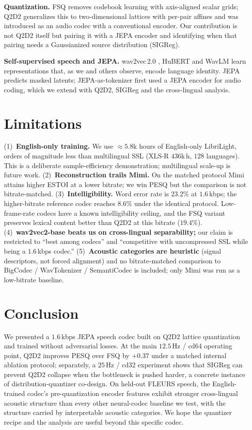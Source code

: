 \documentclass[conference,a4paper]{APSIPA2026}
\begin{document}
\textbf{Quantization.} FSQ \cite{fsq} removes codebook learning with
axis-aligned scalar grids; Q2D2 \cite{q2d2} generalizes this to two-dimensional
lattices with per-pair affines and was introduced as an audio codec with a
conventional encoder. Our contribution is not Q2D2 itself but pairing it with
a JEPA encoder and identifying when that pairing needs a Gaussianized source
distribution (SIGReg).

\textbf{Self-supervised speech and JEPA.} wav2vec\,2.0 \cite{wav2vec2}, HuBERT
\cite{hubert} and WavLM \cite{wavlm} learn representations that, as we and
others observe, encode language identity. JEPA \cite{ijepa,vjepa} predicts
masked latents; JEPA-as-tokenizer \cite{jepa_tokenizer} first used a JEPA
encoder for audio coding, which we extend with Q2D2, SIGReg and the
cross-lingual analysis.

\section{Limitations}
\label{sec:limits}

(1)~\textbf{English-only training.} We use $\approx5.8$k hours of English-only
LibriLight, orders of magnitude less than multilingual SSL (XLS-R $436$k\,h,
$128$ languages). This is a deliberate sample-efficiency demonstration;
multilingual scale-up is future work.
(2)~\textbf{Reconstruction trails Mimi.} On the matched protocol Mimi attains
higher ESTOI at a lower bitrate; we win PESQ but the comparison is not
bitrate-matched.
(3)~\textbf{Intelligibility.} Word error rate is $23.2\%$ at $1.6$\,kbps; the
higher-bitrate reference codec reaches $8.6\%$ under the identical protocol.
Low-frame-rate codecs have a known intelligibility ceiling, and the FSQ variant
preserves lexical content better than Q2D2 at this bitrate ($19.4\%$).
(4)~\textbf{wav2vec2-base beats us on cross-lingual separability;} our claim is
restricted to ``best among codecs'' and ``competitive with uncompressed SSL
while being a $1.6$\,kbps codec.''
(5)~\textbf{Acoustic categories are heuristic} (signal descriptors, not forced
alignment) and no bitrate-matched comparison to BigCodec / WavTokenizer /
SemantiCodec is included; only Mimi was run as a low-bitrate baseline.

\section{Conclusion}

We presented a $1.6$\,kbps JEPA speech codec built on Q2D2 lattice
quantization and trained without adversarial losses. At the main $12.5$\,Hz /
cd64 operating point, Q2D2 improves PESQ over FSQ by $+0.37$ under a matched
internal ablation protocol; separately, a $25$\,Hz / cd32 experiment shows
that SIGReg can prevent Q2D2 collapse when the bottleneck is pushed harder, a
concrete instance of distribution-quantizer co-design. On held-out FLEURS
speech, the English-trained codec's pre-quantization encoder features exhibit
stronger cross-lingual acoustic structure than every other neural-codec
baseline we test, with the structure carried by interpretable acoustic
categories. We hope the quantizer recipe and the analysis are useful beyond
this specific codec.

\FloatBarrier
{\footnotesize


}
\end{document}

